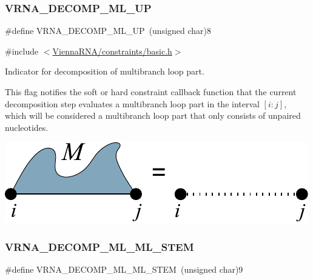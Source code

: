 \subsubsection{\texorpdfstring{V\+R\+N\+A\+\_\+\+D\+E\+C\+O\+M\+P\+\_\+\+M\+L\+\_\+\+UP}{VRNA\_DECOMP\_ML\_UP}}
{\footnotesize\ttfamily \#define V\+R\+N\+A\+\_\+\+D\+E\+C\+O\+M\+P\+\_\+\+M\+L\+\_\+\+UP~(unsigned char)8}



{\ttfamily \#include $<$\hyperlink{constraints_2basic_8h}{Vienna\+R\+N\+A/constraints/basic.\+h}$>$}



Indicator for decomposition of multibranch loop part. 

This flag notifies the soft or hard constraint callback function that the current decomposition step evaluates a multibranch loop part in the interval $[i:j]$, which will be considered a multibranch loop part that only consists of unpaired nucleotides.

 
\begin{DoxyImageNoCaption}
  \mbox{\includegraphics[width=\textwidth,height=\textheight/2,keepaspectratio=true]{decomp_ml_up}}
\end{DoxyImageNoCaption}
 \mbox{\label{group__constraints_ga63d8ceb8c96ae3b463e529e28cc0fe98}} 
\subsubsection{\texorpdfstring{V\+R\+N\+A\+\_\+\+D\+E\+C\+O\+M\+P\+\_\+\+M\+L\+\_\+\+M\+L\+\_\+\+S\+T\+EM}{VRNA\_DECOMP\_ML\_ML\_STEM}}
{\footnotesize\ttfamily \#define V\+R\+N\+A\+\_\+\+D\+E\+C\+O\+M\+P\+\_\+\+M\+L\+\_\+\+M\+L\+\_\+\+S\+T\+EM~(unsigned char)9}



